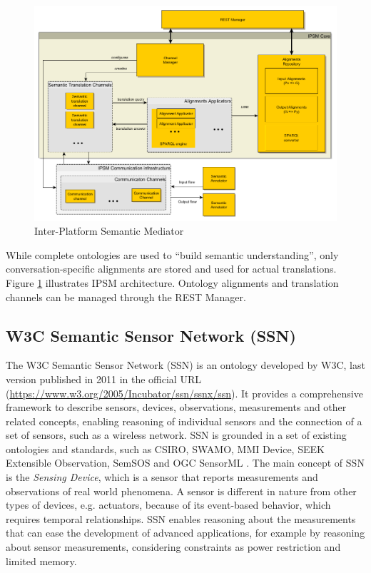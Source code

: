 \documentclass{sig-alternate-05-2015}
\begin{document}
\begin{figure}[h!]
\centering
\includegraphics[scale=0.22]{IPSM}
\caption{Inter-Platform Semantic Mediator}
\label{fig:IPSM}
\end{figure}

While complete ontologies are used to “build semantic understanding”, only conversation-specific alignments are stored and used for actual translations. Figure \ref{fig:IPSM} illustrates IPSM architecture. Ontology alignments and translation channels can be managed through the REST Manager.

\subsection{W3C Semantic Sensor Network (SSN)}
The W3C Semantic Sensor Network (SSN) \cite{Compton2012} is an ontology developed by W3C, last version published in 2011 in the official URL (\url{https://www.w3.org/2005/Incubator/ssn/ssnx/ssn}). It provides a comprehensive framework to describe sensors, devices, observations, measurements and other related concepts, enabling reasoning of individual sensors and the connection of a set of sensors, such as a wireless network. SSN is grounded in a set of existing ontologies and standards, such as CSIRO, SWAMO, MMI Device, SEEK Extensible Observation, SemSOS and OGC SensorML \cite{Ganzha2016a}. The main concept of SSN is the \textit{Sensing Device}, which is a sensor that reports measurements and observations of real world phenomena. A sensor is different in nature from other types of devices, e.g. actuators, because of its event-based behavior, which requires temporal relationships. SSN enables reasoning about the measurements that can ease the development of advanced applications, for example by reasoning about sensor measurements, considering constraints as power restriction and limited memory. 
\end{document}

